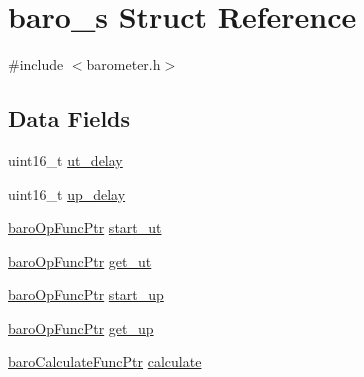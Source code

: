 \hypertarget{structbaro__s}{\section{baro\+\_\+s Struct Reference}
\label{structbaro__s}
}


{\ttfamily \#include $<$barometer.\+h$>$}

\subsection*{Data Fields}
\begin{DoxyCompactItemize}
\item 
uint16\+\_\+t \hyperlink{structbaro__s_ad08f70abf772fdfb765f5cac3456c886}{ut\+\_\+delay}
\item 
uint16\+\_\+t \hyperlink{structbaro__s_aa275390d9662bc19ce180643294a13f7}{up\+\_\+delay}
\item 
\hyperlink{drivers_2barometer_8h_a494900a33dcd5feda551b06a5c2d5a00}{baro\+Op\+Func\+Ptr} \hyperlink{structbaro__s_a3419282d6bbf84f3f1e8693a38c785fc}{start\+\_\+ut}
\item 
\hyperlink{drivers_2barometer_8h_a494900a33dcd5feda551b06a5c2d5a00}{baro\+Op\+Func\+Ptr} \hyperlink{structbaro__s_a04ab09a89a59522af7992bf60feac29d}{get\+\_\+ut}
\item 
\hyperlink{drivers_2barometer_8h_a494900a33dcd5feda551b06a5c2d5a00}{baro\+Op\+Func\+Ptr} \hyperlink{structbaro__s_aa6c211e14f468df00d7fa870eafe3258}{start\+\_\+up}
\item 
\hyperlink{drivers_2barometer_8h_a494900a33dcd5feda551b06a5c2d5a00}{baro\+Op\+Func\+Ptr} \hyperlink{structbaro__s_a7a73e435ea3cc2c3ce1568c4443a1552}{get\+\_\+up}
\item 
\hyperlink{drivers_2barometer_8h_a5a57aec1e1a50145f880ce5cc160adb0}{baro\+Calculate\+Func\+Ptr} \hyperlink{structbaro__s_a18f00610d5bce1ac2052e4b77095fe80}{calculate}
\end{DoxyCompactItemize}


